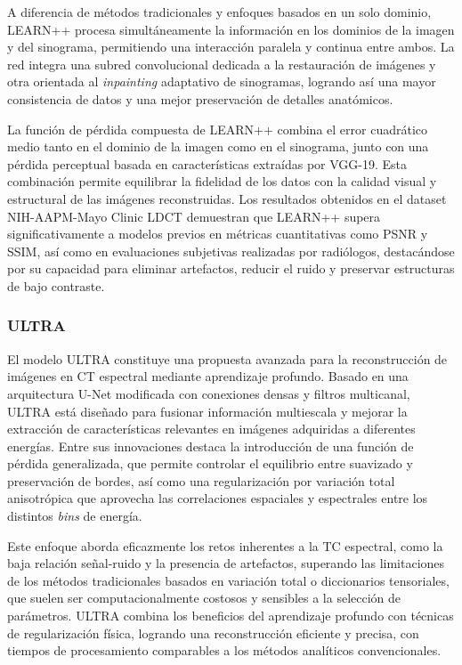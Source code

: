 A diferencia de métodos tradicionales y enfoques basados en un solo dominio, LEARN++ procesa simultáneamente la información en los dominios de la imagen y del sinograma, permitiendo una interacción paralela y continua entre ambos. La red integra una subred convolucional dedicada a la restauración de imágenes y otra orientada al \textit{inpainting} adaptativo de sinogramas, logrando así una mayor consistencia de datos y una mejor preservación de detalles anatómicos.

La función de pérdida compuesta de LEARN++ combina el error cuadrático medio tanto en el dominio de la imagen como en el sinograma, junto con una pérdida perceptual basada en características extraídas por VGG-19. Esta combinación permite equilibrar la fidelidad de los datos con la calidad visual y estructural de las imágenes reconstruidas. Los resultados obtenidos en el dataset NIH-AAPM-Mayo Clinic LDCT demuestran que LEARN++ supera significativamente a modelos previos en métricas cuantitativas como PSNR y SSIM, así como en evaluaciones subjetivas realizadas por radiólogos, destacándose por su capacidad para eliminar artefactos, reducir el ruido y preservar estructuras de bajo contraste.

\subsubsection{ULTRA}

El modelo ULTRA \cite{ULTRA} constituye una propuesta avanzada para la reconstrucción de imágenes en CT espectral  mediante aprendizaje profundo. Basado en una arquitectura U-Net modificada con conexiones densas y filtros multicanal, ULTRA está diseñado para fusionar información multiescala y mejorar la extracción de características relevantes en imágenes adquiridas a diferentes energías. Entre sus innovaciones destaca la introducción de una función de pérdida generalizada, que permite controlar el equilibrio entre suavizado y preservación de bordes, así como una regularización por variación total anisotrópica que aprovecha las correlaciones espaciales y espectrales entre los distintos \textit{bins} de energía.

Este enfoque aborda eficazmente los retos inherentes a la TC espectral, como la baja relación señal-ruido y la presencia de artefactos, superando las limitaciones de los métodos tradicionales basados en variación total o diccionarios tensoriales, que suelen ser computacionalmente costosos y sensibles a la selección de parámetros. ULTRA combina los beneficios del aprendizaje profundo con técnicas de regularización física, logrando una reconstrucción eficiente y precisa, con tiempos de procesamiento comparables a los métodos analíticos convencionales.

